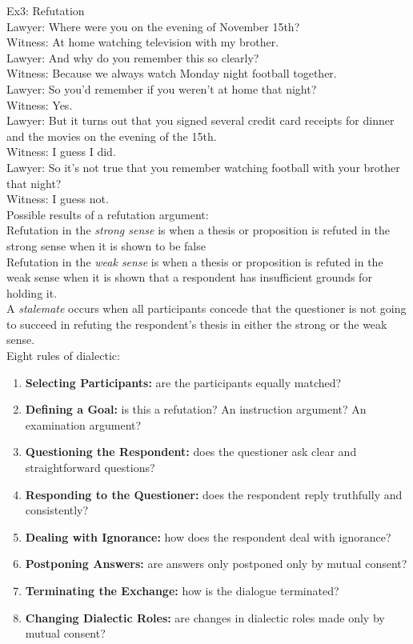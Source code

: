Ex3: Refutation\\
Lawyer: Where were you on the evening of November 15th?\\
Witness: At home watching television with my brother.\\
Lawyer: And why do you remember this so clearly?\\
Witness: Because we always watch Monday night football together.\\
Lawyer: So you’d remember if you weren’t at home that night?\\
Witness: Yes.\\
Lawyer: But it turns out that you signed several credit card receipts for dinner and the movies on the evening of the 15th.\\
Witness: I guess I did.\\
Lawyer: So it’s not true that you remember watching football with your brother that night?\\
Witness: I guess not.\\

Possible results of a refutation argument:\\
Refutation in the \textit{strong sense} is when a thesis or proposition is refuted in the strong sense when it is shown to be false\\
Refutation in the \textit{weak sense} is when a thesis or proposition is refuted in the weak sense when it is shown that a respondent has insufficient grounds for holding it.\\
A \textit{stalemate} occurs when all participants concede that the questioner is not going to succeed in refuting the respondent's thesis in either the strong or the weak sense.\\

Eight rules of dialectic:
\begin{enumerate}
    \item \textbf{Selecting Participants:} are the participants equally matched?
    \item \textbf{Defining a Goal:} is this a refutation? An instruction argument? An examination argument?
    \item \textbf{Questioning the Respondent:} does the questioner ask clear and straightforward questions?
    \item \textbf{Responding to the Questioner:} does the respondent reply truthfully and consistently?
    \item \textbf{Dealing with Ignorance:} how does the respondent deal with ignorance?
    \item \textbf{Postponing Answers:} are answers only postponed only by mutual consent?
    \item \textbf{Terminating the Exchange:} how is the dialogue terminated?
    \item \textbf{Changing Dialectic Roles:} are changes in dialectic roles made only by mutual consent?
\end{enumerate}

